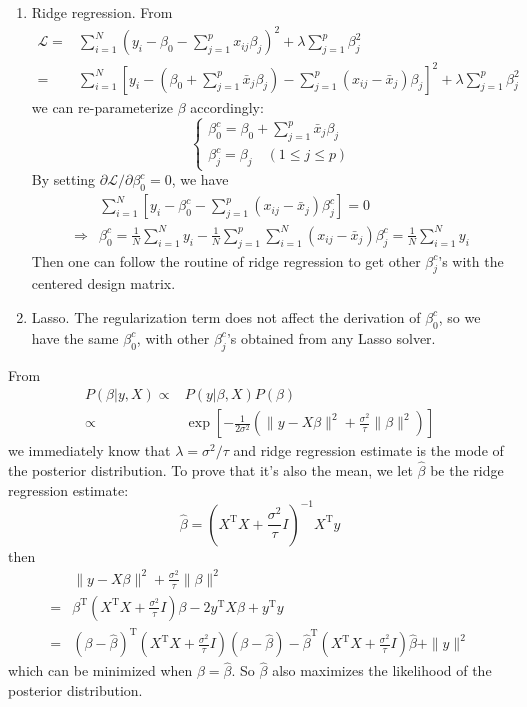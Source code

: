 \begin{sol}
\begin{enumerate}
\item Ridge regression. From
\begin{align*}
\mathcal{L} =& \sum_{i=1}^{N}\left(y_i-\beta_0-\sum_{j=1}^{p}x_{ij}\beta_j\right)^2+\lambda\sum_{j=1}^{p}\beta_j^2\\
=& \sum_{i=1}^{N}\left[y_i-\left(\beta_0+\sum_{j=1}^{p}\bar{x}_j\beta_j\right)-\sum_{j=1}^{p}\left(x_{ij}-\bar{x}_j\right)\beta_j\right]^2+\lambda\sum_{j=1}^{p}\beta_j^2
\end{align*}
we can re-parameterize $\beta$ accordingly:
\[
\begin{cases}
\beta_0^c=\beta_0+\sum_{j=1}^{p}\bar{x}_j\beta_j\\
\beta_j^c=\beta_j\quad(1\le j\le p)
\end{cases}
\]
By setting $\partial \mathcal{L}/\partial \beta^c_0=0$, we have
\begin{align*}
& \sum_{i=1}^{N}\left[y_i-\beta_0^c-\sum_{j=1}^{p}\left(x_{ij}-\bar{x}_j\right)\beta^c_j\right]=0\\
\Longrightarrow & \beta_0^c=\frac{1}{N}\sum_{i=1}^{N}y_i-\frac{1}{N}\sum_{j=1}^{p}\sum_{i=1}^{N}\left(x_{ij}-\bar{x}_j\right)\beta^c_j=\frac{1}{N}\sum_{i=1}^{N}y_i
\end{align*}
Then one can follow the routine of ridge regression to get other $\beta_j^c$'s with the centered design matrix.
\item Lasso. The regularization term does not affect the derivation of $\beta_0^c$, so we have the same $\beta_0^c$, with other $\beta_j^c$'s obtained from any Lasso solver.
\end{enumerate}
\end{sol}

\begin{sol}
From
\begin{align*}
P(\beta\vert y,X) \propto & P(y\vert\beta,X)P(\beta)\\
\propto& \exp\left[-\frac{1}{2\sigma^2}\left(\|y-X\beta\|^2+\frac{\sigma^2}{\tau}\|\beta\|^2\right)\right]
\end{align*}
we immediately know that $\lambda=\sigma^2/\tau$ and ridge regression estimate is the mode of the posterior distribution. To prove that it's also the mean, we let $\hat{\beta}$ be the ridge regression estimate:
\[
\hat{\beta}=\left(X^\mathrm{T}X+\frac{\sigma^2}{\tau}I\right)^{-1}X^\mathrm{T}y
\]
then
\begin{align*}
& \|y-X\beta\|^2+\frac{\sigma^2}{\tau}\|\beta\|^2 \\
=& \beta^\mathrm{T}\left(X^\mathrm{T}X+\frac{\sigma^2}{\tau}I\right)\beta - 2y^\mathrm{T}X\beta + y^\mathrm{T}y\\
=& (\beta-\hat{\beta})^\mathrm{T}\left(X^\mathrm{T}X+\frac{\sigma^2}{\tau}I\right)(\beta-\hat{\beta})-\hat{\beta}^\mathrm{T}\left(X^\mathrm{T}X+\frac{\sigma^2}{\tau}I\right)\hat{\beta}+\|y\|^2
\end{align*}
which can be minimized when $\beta=\hat{\beta}$. So $\hat{\beta}$ also maximizes the likelihood of the posterior distribution.
\end{sol}

